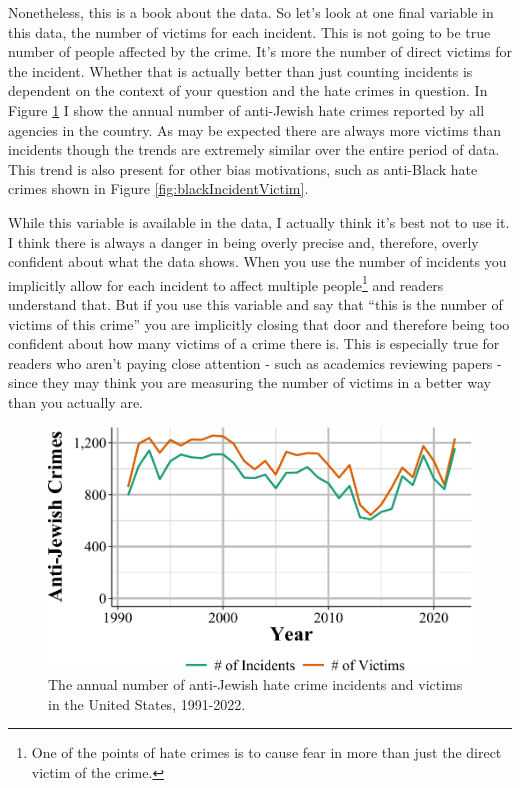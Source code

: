 \documentclass[
  12pt,
  openany]{book}
\begin{document}
Nonetheless, this is a book about the data. So let's look at one final variable in this data, the number of victims for each incident. This is not going to be true number of people affected by the crime. It's more the number of direct victims for the incident. Whether that is actually better than just counting incidents is dependent on the context of your question and the hate crimes in question. In Figure \ref{fig:jewishIncidentVictim} I show the annual number of anti-Jewish hate crimes reported by all agencies in the country. As may be expected there are always more victims than incidents though the trends are extremely similar over the entire period of data. This trend is also present for other bias motivations, such as anti-Black hate crimes shown in Figure \ref{fig:blackIncidentVictim}.

While this variable is available in the data, I actually think it's best not to use it. I think there is always a danger in being overly precise and, therefore, overly confident about what the data shows. When you use the number of incidents you implicitly allow for each incident to affect multiple people\footnote{One of the points of hate crimes is to cause fear in more than just the direct victim of the crime.} and readers understand that. But if you use this variable and say that ``this is the number of victims of this crime'' you are implicitly closing that door and therefore being too confident about how many victims of a crime there is. This is especially true for readers who aren't paying close attention - such as academics reviewing papers - since they may think you are measuring the number of victims in a better way than you actually are.

\begin{figure}

{\centering \includegraphics[width=0.9\linewidth]{09_hate_crime_files/figure-latex/jewishIncidentVictim-1} 

}

\caption{The annual number of anti-Jewish hate crime incidents and victims in the United States, 1991-2022.}\label{fig:jewishIncidentVictim}
\end{figure}
\end{document}
